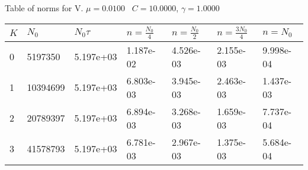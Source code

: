 \begin{center}
Table of norms for V. $\mu = 0.0100$ \, $C = 10.0000$, $\gamma = 1.0000$
  
\begin{tabular}{|p{0.8in}|p{0.8in}|p{0.8in}|p{0.8in}|p{0.8in}|p{0.8in}|p{0.8in}|} \hline
$K$ &$N_0$ &$N_0 \tau$ &$n = \frac{N_0}{4}$ &$n = \frac{N_0}{2}$ &$n = \frac{3N_0}{4}$ &$n = N_0$ \\ \hline 
0 &5197350 &5.197e+03 &1.187e-02 &4.526e-03 &2.155e-03 &9.998e-04 \\ \hline 
1 &10394699 &5.197e+03 &6.803e-03 &3.945e-03 &2.463e-03 &1.437e-03 \\ \hline 
2 &20789397 &5.197e+03 &6.894e-03 &3.268e-03 &1.659e-03 &7.737e-04 \\ \hline 
3 &41578793 &5.197e+03 &6.781e-03 &2.967e-03 &1.375e-03 &5.684e-04 \\ \hline 

\end{tabular}\\[20pt]
\end{center}

